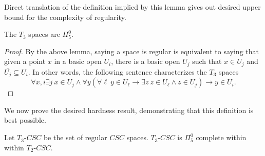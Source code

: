 \documentclass[11pt]{amsart}
\theoremstyle{remark}
\begin{document}
Direct translation of the definition implied by this lemma gives out desired upper bound for the complexity of regularity.

\begin{proposition}
The $T_3$ spaces are $\Pi_5^0$.
\end{proposition}

\begin{proof}
By the above lemma, saying a space is regular is equivalent to saying that given a point $x$ in a basic open $U_i$, there is a basic open $U_j$ such that $x\in U_j$ and $\overline{U_j}\subseteq U_i$.
In other words, the following sentence characterizes the $T_3$ spaces
\[\forall x,i \exists j ~ x\in U_j \land \forall y (\forall \ell ~ y\in U_\ell \to \exists z ~ z\in U_\ell \land  z\in U_j) \to y\in U_i. \]
\end{proof}

We now prove the desired hardness result, demonstrating that this definition is best possible.

\begin{theorem}\label{thm:T3Completeness}
    Let $T_3$-$CSC$ be the set of regular $CSC$ spaces.
    $T_3$-$CSC$ is $\Pi_5^0$ complete within within $T_2$-$CSC$.
\end{theorem}
\end{document}
